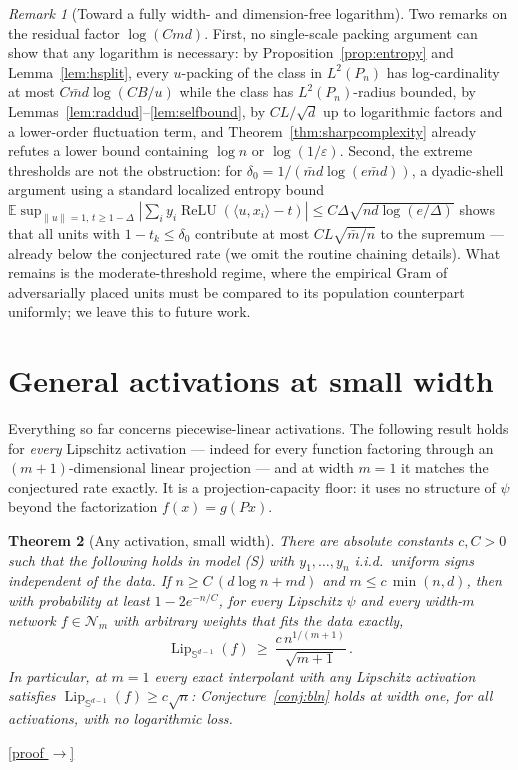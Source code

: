 \documentclass[11pt,reqno]{amsart}
\theoremstyle{plain}
\newtheorem{theorem}{Theorem}[section]
\theoremstyle{definition}
\theoremstyle{remark}
\newtheorem{remark}[theorem]{Remark}
\newcommand{\Sd}{\mathbb{S}^{d-1}}
\newcommand{\EE}{\mathbb{E}}
\newcommand{\eps}{\varepsilon}
\newcommand{\Lip}{\operatorname{Lip}}
\newcommand{\relu}{\operatorname{ReLU}}
\newcommand{\NN}{\mathcal{N}}
\newcommand{\inn}[2]{\langle #1,#2\rangle}
\newcommand{\proofbutton}[1]{\hyperref[proof:#1]{\textnormal{\footnotesize\textsf{[proof $\to$]}}}}
\begin{document}
\begin{remark}[Toward a fully width- and dimension-free logarithm]\label{rem:residual}
Two remarks on the residual factor $\log(Cmd)$. First, no single-scale packing argument can show that any logarithm is necessary: by Proposition~\ref{prop:entropy} and Lemma~\ref{lem:hsplit}, every $u$-packing of the class in $L^2(P_n)$ has log-cardinality at most $C\bar md\log(CB/u)$ while the class has $L^2(P_n)$-radius bounded, by Lemmas~\ref{lem:raddud}--\ref{lem:selfbound}, by $CL/\sqrt d$ up to logarithmic factors and a lower-order fluctuation term, and Theorem~\ref{thm:sharpcomplexity} already refutes a lower bound containing $\log n$ or $\log(1/\eps)$. Second, the extreme thresholds are not the obstruction: for $\delta_0=1/(\bar md\log(e\bar md))$, a dyadic-shell argument using a standard localized entropy bound $\EE\sup_{\|u\|=1,\,t\ge1-\Delta}|\sum_iy_i\relu(\inn u{x_i}-t)|\le C\Delta\sqrt{nd\log(e/\Delta)}$ shows that all units with $1-t_k\le\delta_0$ contribute at most $CL\sqrt{\bar m/n}$ to the supremum --- already below the conjectured rate (we omit the routine chaining details). What remains is the moderate-threshold regime, where the empirical Gram of adversarially placed units must be compared to its population counterpart uniformly; we leave this to future work.
\end{remark}

\section{General activations at small width}\label{sec:genact}

Everything so far concerns piecewise-linear activations. The following result holds for \emph{every} Lipschitz activation --- indeed for every function factoring through an $(m{+}1)$-dimensional linear projection --- and at width $m=1$ it matches the conjectured rate exactly. It is a projection-capacity floor: it uses no structure of $\psi$ beyond the factorization $f(x)=g(Px)$.

\begin{theorem}[Any activation, small width]\label{thm:genact}
There are absolute constants $c,C>0$ such that the following holds in model (S) with $y_1,\dots,y_n$ i.i.d.\ uniform signs independent of the data. If $n\ge C\,(d\log n+md)$ and $m\le c\,\min(n,d)$, then with probability at least $1-2e^{-n/C}$, for \emph{every} Lipschitz $\psi$ and every width-$m$ network $f\in\NN_m$ with arbitrary weights that fits the data exactly,
\[
\Lip_{\Sd}(f)\ \ge\ \frac{c\,n^{1/(m+1)}}{\sqrt{m+1}}\,.
\]
In particular, at $m=1$ every exact interpolant with any Lipschitz activation satisfies $\Lip_{\Sd}(f)\ge c\sqrt n$: Conjecture~\ref{conj:bln} holds at width one, for all activations, with no logarithmic loss.
\end{theorem}
\proofbutton{genact}
\end{document}
